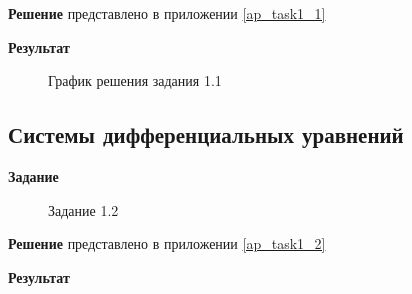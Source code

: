 \documentclass[otchet]{SCWorks}
\begin{document}
\textbf{Решение} представлено в приложении \ref{ap_task1_1}

\textbf{Результат}

\begin{figure}[H]
	\caption{График решения задания 1.1}
	\label{res1}
\end{figure}

\subsection{Системы дифференциальных уравнений}

\textbf{Задание}

\begin{figure}[H]
	\caption{Задание 1.2}
	\label{pic2}
\end{figure}

\textbf{Решение} представлено в приложении \ref{ap_task1_2}

\textbf{Результат}
\end{document}

